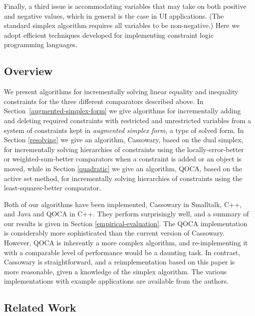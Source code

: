 \documentclass{article}
\begin{document}
Finally, a third issue is accommodating variables that may take on both
positive and negative values, which in general is the case in UI
applications.  (The standard simplex algorithm requires all variables to be
non-negative.)  Here we adopt efficient techniques developed for
implementing constraint logic programming languages.

\subsection{Overview}

We present algorithms for incrementally solving linear equality and
inequality constraints for the three different comparators described
above. In Section~\ref{augmented-simplex-form} we give algorithms for
incrementally adding and deleting required constraints with restricted and
unrestricted variables from a system of constraints kept in {\em augmented
simplex form}, a type of solved form.  In Section \ref{resolving} we give
an algorithm, Cassowary, based on the dual simplex, for incrementally
solving hierarchies of constraints using the locally-error-better or
weighted-sum-better comparators when a constraint is added or an object is
moved, while in Section \ref{quadratic} we give an algorithm, QOCA, based
on the active set method, for incrementally solving hierarchies of
constraints using the least-squares-better comparator.

Both of our algorithms have been implemented, Cassowary in
Smalltalk, C++, and Java and QOCA in C++\@.  They perform surprisingly well, and a summary
of our results is given in Section \ref{empirical-evaluation}.  The QOCA
implementation is considerably more sophisticated 
than the current version of Cassowary.  However, QOCA is
inherently a more complex algorithm, and re-implementing it with a
comparable level of performance would be a daunting task.  In contrast,
Cassowary is straightforward, and a reimplementation based on this paper is
more reasonable, given a knowledge of the simplex algorithm.  The
various implementations with example applications are available from the 
authors.

\subsection{Related Work}
\end{document}
